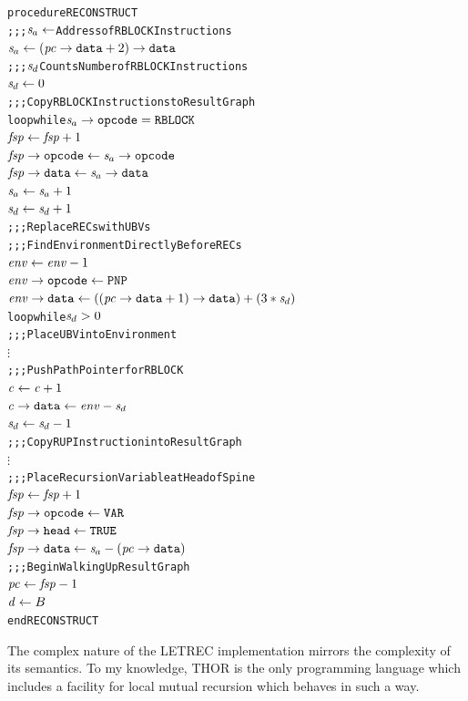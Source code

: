 \par\smallskip\noindent\begin{minipage}{\linewidth}
\begin{alltt}
procedure RECONSTRUCT
  \textrm{;;; \(\rtsa \leftarrow\) Address of RBLOCK Instructions}
  \(\rtsa \leftarrow (\rtfield{pc}{data}+2)\rightarrow\mathtt{data}\)
  \textrm{;;; \(\rtsd\) Counts Number of RBLOCK Instructions}
  \(\rtsd \leftarrow 0\)
  \textrm{;;; Copy RBLOCK Instructions to Result Graph}
  loop while \(\rtsa\rightarrow\mathtt{opcode} = \mathtt{RBLOCK}\)
    \(\rt{fsp} \leftarrow \rt{fsp}+1\)
    \(\rtfield{fsp}{opcode} \leftarrow \rtsa\rightarrow\mathtt{opcode}\)
    \(\rtfield{fsp}{data} \leftarrow \rtsa\rightarrow\mathtt{data}\)
    \(\rtsa \leftarrow \rtsa+1\)
    \(\rtsd \leftarrow \rtsd+1\)
  \textrm{;;; Replace RECs with UBVs}
  \textrm{;;; Find Environment Directly Before RECs}
  \(\rt{env} \leftarrow \rt{env}-1\)
  \(\rtfield{env}{opcode} \leftarrow \mathtt{PNP}\)
  \(\rtfield{env}{data} \leftarrow ((\rtfield{pc}{data}+1)\rightarrow\mathtt{data})+(3*\rtsd)\)
  loop while \(\rtsd > 0\)
    \textrm{;;; Place UBV into Environment}
    \(\vdots\)
    \textrm{;;; Push Path Pointer for RBLOCK}
    \(\rt{c} \leftarrow \rt{c}+1\)
    \(\rtfield{c}{data} \leftarrow \rt{env}-\rtsd\)
    \(\rtsd \leftarrow \rtsd-1\)
  \textrm{;;; Copy RUP Instruction into Result Graph}
  \(\vdots\)
  \textrm{;;; Place Recursion Variable at Head of Spine}
  \(\rt{fsp} \leftarrow \rt{fsp}+1\)
  \(\rtfield{fsp}{opcode} \leftarrow \mathtt{VAR}\)
  \(\rtfield{fsp}{head} \leftarrow \mathtt{TRUE}\)
  \(\rtfield{fsp}{data} \leftarrow \rtsa-(\rtfield{pc}{data})\)
  \textrm{;;; Begin Walking Up Result Graph}
  \(\rt{pc} \leftarrow \rt{fsp}-1\)
  \(\rt{d} \leftarrow B\)
end RECONSTRUCT
\end{alltt}
\end{minipage}\par\smallskip


The complex nature of the LETREC implementation mirrors the complexity of its semantics.
To my knowledge, THOR is the only programming language which includes a facility for local
mutual recursion which behaves in such a way.
